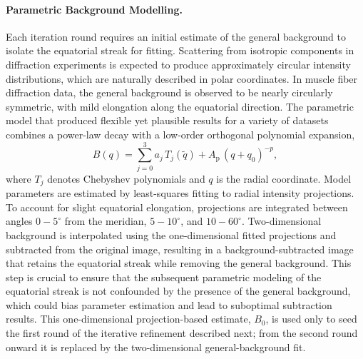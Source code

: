 \documentclass[iucr]{iucrjournals}
\begin{document}
\paragraph{Parametric Background Modelling.}

Each iteration round requires an initial estimate of the general background to isolate the equatorial streak for fitting. Scattering from isotropic components in diffraction experiments is expected to produce approximately circular intensity distributions, which are naturally described in polar coordinates. In muscle fiber diffraction data, the general background is observed to be nearly circularly symmetric, with mild elongation along the equatorial direction. The parametric model that produced flexible yet plausible results for a variety of datasets combines a power-law decay with a low-order orthogonal polynomial expansion,
\begin{equation}
B(q) = \sum_{j=0}^{3} a_j\, T_j(\tilde q) + A_{\mathrm{p}}\, (q + q_0)^{-p},
\end{equation}
where $T_j$ denotes Chebyshev polynomials and $q$ is the radial coordinate. Model parameters are estimated by least-squares fitting to radial intensity projections. To account for slight equatorial elongation, projections are integrated between angles $0-5^{\circ}$ from the meridian, $5-10^{\circ}$, and $10-60^{\circ}$. Two-dimensional background is interpolated using the one-dimensional fitted projections and subtracted from the original image, resulting in a background-subtracted image that retains the equatorial streak while removing the general background. This step is crucial to ensure that the subsequent parametric modeling of the equatorial streak is not confounded by the presence of the general background, which could bias parameter estimation and lead to suboptimal subtraction results. This one-dimensional projection-based estimate, $B_0$, is used only to seed the first round of the iterative refinement described next; from the second round onward it is replaced by the two-dimensional general-background fit.
\end{document}

